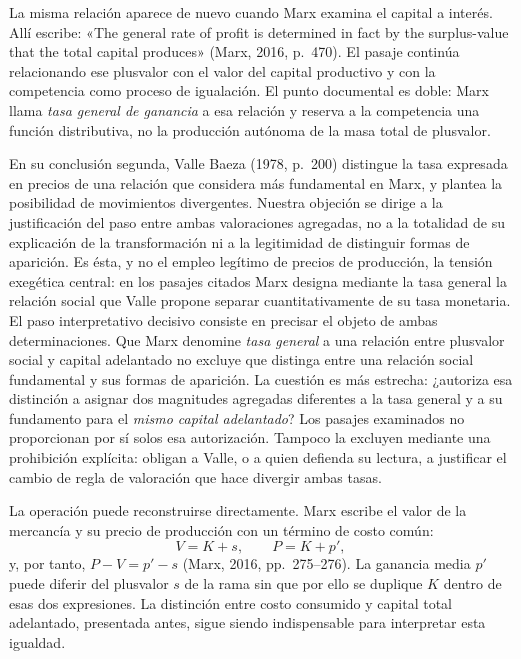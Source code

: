 \documentclass[10pt,twoside]{article}
\begin{document}
La misma relación aparece de nuevo cuando Marx examina el capital a interés. Allí escribe: «The general rate of profit is determined in fact by the surplus-value that the total capital produces» (Marx, 2016, p.~470). El pasaje continúa relacionando ese plusvalor con el valor del capital productivo y con la competencia como proceso de igualación. El punto documental es doble: Marx llama \emph{tasa general de ganancia} a esa relación y reserva a la competencia una función distributiva, no la producción autónoma de la masa total de plusvalor.

En su conclusión segunda, Valle Baeza (1978, p.~200) distingue la tasa expresada en precios de una relación que considera más fundamental en Marx, y plantea la posibilidad de movimientos divergentes. Nuestra objeción se dirige a la justificación del paso entre ambas valoraciones agregadas, no a la totalidad de su explicación de la transformación ni a la legitimidad de distinguir formas de aparición. Es ésta, y no el empleo legítimo de precios de producción, la tensión exegética central: en los pasajes citados Marx designa mediante la tasa general la relación social que Valle propone separar cuantitativamente de su tasa monetaria. El paso interpretativo decisivo consiste en precisar el objeto de ambas determinaciones. Que Marx denomine \emph{tasa general} a una relación entre plusvalor social y capital adelantado no excluye que distinga entre una relación social fundamental y sus formas de aparición. La cuestión es más estrecha: ¿autoriza esa distinción a asignar dos magnitudes agregadas diferentes a la tasa general y a su fundamento para el \emph{mismo capital adelantado}? Los pasajes examinados no proporcionan por sí solos esa autorización. Tampoco la excluyen mediante una prohibición explícita: obligan a Valle, o a quien defienda su lectura, a justificar el cambio de regla de valoración que hace divergir ambas tasas.

La operación puede reconstruirse directamente. Marx escribe el valor de la mercancía y su precio de producción con un término de costo común: 
\begin{equation}
V=K+s,\qquad P=K+p',\label{eq:marx_costo_comun}
\end{equation}
y, por tanto, $P-V=p'-s$ (Marx, 2016, pp.~275--276). La ganancia media $p'$ puede diferir del plusvalor $s$ de la rama sin que por ello se duplique $K$ dentro de esas dos expresiones. La distinción entre costo consumido y capital total adelantado, presentada antes, sigue siendo indispensable para interpretar esta igualdad.
\end{document}
